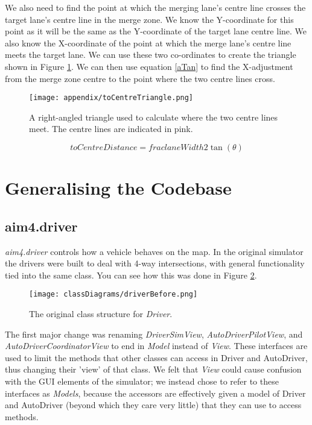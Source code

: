 \begin{appendices}
We also need to find the point at which the merging lane's centre line crosses the target lane's centre line in the merge zone. We know the Y-coordinate for this point as it will be the same as the Y-coordinate of the target lane centre line. We also know the X-coordinate of the point at which the merge lane's centre line meets the target lane. We can use these two co-ordinates to create the triangle shown in Figure \ref{fig:toCentreTriangle}. We can then use equation \ref{aTan} to find the X-adjustment from the merge zone centre to the point where the two centre lines cross.

\begin{figure}[htb]
\centering
\texttt{[image: appendix/toCentreTriangle.png]}
\caption{A right-angled triangle used to calculate where the two centre lines meet. The centre lines are indicated in pink.}
\label{fig:toCentreTriangle}
\end{figure}

\begin{equation}\label{aTan}
toCentreDistance = frac{laneWidth}{2 \tan(\theta)}
\end{equation}

\section{Generalising the Codebase}
\label{sec:Generalising the Codebase Appendix}

\subsection{aim4.driver}
\label{subsec:aim4.driver}
\emph{aim4.driver} controls how a vehicle behaves on the map. In the original simulator the drivers were built to deal with 4-way intersections, with general functionality tied into the same class. You can see how this was done in Figure \ref{fig:driverBefore}.

\begin{figure}[htb]
\texttt{[image: classDiagrams/driverBefore.png]}
\caption{The original class structure for \emph{Driver}.}
\label{fig:driverBefore}
\end{figure}

The first major change was renaming \emph{DriverSimView}, \emph{AutoDriverPilotView}, and \emph{AutoDriverCoordinatorView} to end in \emph{Model} instead of \emph{View}. These interfaces are used to limit the methods that other classes can access in Driver and AutoDriver, thus changing their 'view' of that class. We felt that \emph{View} could cause confusion with the GUI elements of the simulator; we instead chose to refer to these interfaces as \emph{Models}, because the accessors are effectively given a model of Driver and AutoDriver (beyond which they care very little) that they can use to access methods.


\end{appendices}
